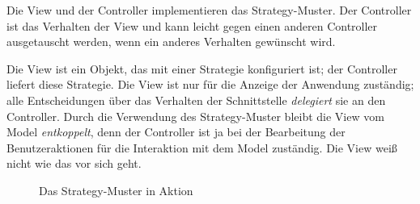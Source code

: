 \documentclass[11pt,a4paper,titlepage]{scrreprt}
\begin{document}
Die View und der Controller implementieren das Strategy-Muster. Der Controller ist das
Verhalten der View und kann leicht gegen einen anderen Controller ausgetauscht werden,
wenn ein anderes Verhalten gewünscht wird.

Die View ist ein Objekt, das mit einer Strategie konfiguriert ist; der Controller
liefert diese Strategie. Die View ist nur für die Anzeige der Anwendung zuständig;
alle Entscheidungen über das Verhalten der Schnittstelle {\itshape delegiert} sie an
den Controller. Durch die Verwendung des Strategy-Muster bleibt die View vom
Model {\itshape entkoppelt}, denn der Controller ist ja bei der Bearbeitung der
Benutzeraktionen für die Interaktion mit dem Model zuständig. Die View weiß nicht
wie das vor sich geht.

\begin{figure}[h]
\caption{Das Strategy-Muster in Aktion}
\end{figure}
\end{document}
